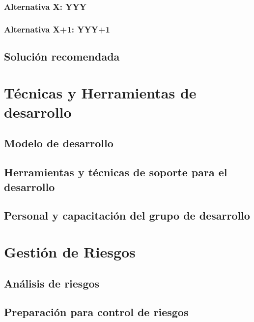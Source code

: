 \documentclass[letterpaper,spanish,10pt]{article}
\begin{document}
\subsubsection{Alternativa X: YYY}



\subsubsection{Alternativa X+1: YYY+1}



\subsection{Soluci\'on recomendada}



\newpage
\section{T\'ecnicas y Herramientas de desarrollo} %
\subsection{Modelo de desarrollo}



\subsection{Herramientas y t\'ecnicas de soporte para el desarrollo}



\subsection{Personal y capacitaci\'on del grupo de desarrollo}



\newpage
\section{Gesti\'on de Riesgos} %
\subsection{An\'alisis de riesgos}



\subsection{Preparaci\'on para control de riesgos}
\end{document}
